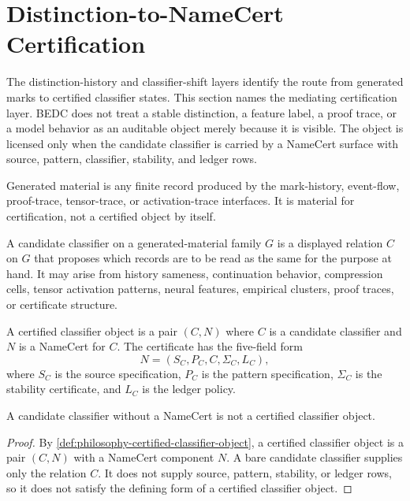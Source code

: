 \section{Distinction-to-NameCert Certification}
\label{sec:visions-philosophy-distinction-to-namecert-certification}

The distinction-history and classifier-shift layers identify the route
from generated marks to certified classifier states. This section names
the mediating certification layer. BEDC does not treat a stable
distinction, a feature label, a proof trace, or a model behavior as an
auditable object merely because it is visible. The object is licensed
only when the candidate classifier is carried by a NameCert surface with
source, pattern, classifier, stability, and ledger rows.

\begin{definition}
\label{def:philosophy-generated-material}
Generated material is any finite record produced by the mark-history,
event-flow, proof-trace, tensor-trace, or activation-trace interfaces.
It is material for certification, not a certified object by itself.
\end{definition}

\begin{definition}
\label{def:philosophy-candidate-classifier}
A candidate classifier on a generated-material family $G$ is a displayed
relation $C$ on $G$ that proposes which records are to be read as the
same for the purpose at hand. It may arise from history sameness,
continuation behavior, compression cells, tensor activation patterns,
neural features, empirical clusters, proof traces, or certificate
structure.
\end{definition}

\begin{definition}
\label{def:philosophy-certified-classifier-object}
A certified classifier object is a pair $(C,N)$ where $C$ is a candidate
classifier and $N$ is a NameCert for $C$. The certificate has the
five-field form
$$
N=
(S_C,P_C,C,\Sigma_C,L_C),
$$
where $S_C$ is the source specification, $P_C$ is the pattern
specification, $\Sigma_C$ is the stability certificate, and $L_C$ is the
ledger policy.
\end{definition}

\begin{theorem}
\label{thm:philosophy-candidate-classifier-not-certified-object}
A candidate classifier without a NameCert is not a certified classifier
object.
\end{theorem}
\begin{proof}
By \autoref{def:philosophy-certified-classifier-object}, a certified
classifier object is a pair $(C,N)$ with a NameCert component $N$.
A bare candidate classifier supplies only the relation $C$. It does not
supply source, pattern, stability, or ledger rows, so it does not satisfy
the defining form of a certified classifier object.
\end{proof}

